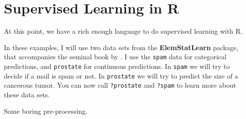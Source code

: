 \documentclass[]{book}
\theoremstyle{definition}
\theoremstyle{definition}
\theoremstyle{definition}
\theoremstyle{remark}
\begin{document}
\section{Supervised Learning in R}\label{supervised-learning-in-r}

At this point, we have a rich enough language to do supervised learning
with R.

In these examples, I will use two data sets from the
\textbf{ElemStatLearn} package, that accompanies the seminal book by
\citet{friedman2001elements}. I use the \texttt{spam} data for
categorical predictions, and \texttt{prostate} for continuous
predictions. In \texttt{spam} we will try to decide if a mail is spam or
not. In \texttt{prostate} we will try to predict the size of a cancerous
tumor. You can now call \texttt{?prostate} and \texttt{?spam} to learn
more about these data sets.

Some boring pre-processing.
\end{document}
